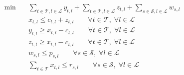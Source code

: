 \begin{align}
  \min\quad & \sum_{t \in \mathcal{T}, l \in \mathcal{L}} y_{t,l} + \sum_{t \in \mathcal{T}, l \in \mathcal{L}} z_{t,l} + \sum_{s \in \mathcal{S}, l \in \mathcal{L}} w_{s,l} \tag{rescheduling\_cost} \\
  & x_{t,l} \le c_{t,l} + z_{t,l} \qquad \forall t \in \mathcal{T},\; \forall l \in \mathcal{L} \tag{rescheduling} \\
  & y_{t,l} \ge x_{t,l} - c_{t,l} \qquad \forall t \in \mathcal{T},\; \forall l \in \mathcal{L} \tag{cancellation} \\
  & z_{t,l} \ge x_{t,l} - c_{t,l} \qquad \forall t \in \mathcal{T},\; \forall l \in \mathcal{L} \tag{retiming} \\
  & w_{s,l} \le p_{s,l} \qquad \forall s \in \mathcal{S},\; \forall l \in \mathcal{L} \tag{platform} \\
  & \sum_{t \in \mathcal{T}} x_{t,l} \le r_{s,l} \qquad \forall s \in \mathcal{S},\; \forall l \in \mathcal{L} \tag{rolling\_stock} \\
\end{align}